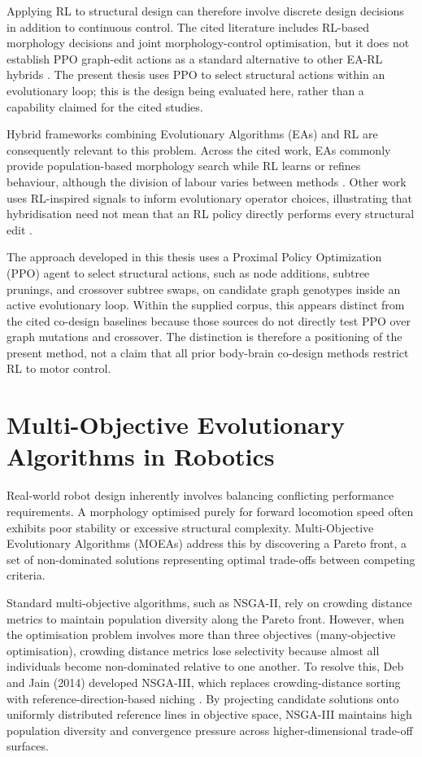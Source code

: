 \documentclass[12pt,a4paper]{report}
\begin{document}
Applying RL to structural design can therefore involve discrete design decisions in addition to continuous control. The cited literature includes RL-based morphology decisions and joint morphology-control optimisation, but it does not establish PPO graph-edit actions as a standard alternative to other EA-RL hybrids \citep{li2024reinforcement,sun2023co,li2024bridging}. The present thesis uses PPO to select structural actions within an evolutionary loop; this is the design being evaluated here, rather than a capability claimed for the cited studies.

Hybrid frameworks combining Evolutionary Algorithms (EAs) and RL are consequently relevant to this problem. Across the cited work, EAs commonly provide population-based morphology search while RL learns or refines behaviour, although the division of labour varies between methods \citep{li2023modular,sun2023co,li2024bridging}. Other work uses RL-inspired signals to inform evolutionary operator choices, illustrating that hybridisation need not mean that an RL policy directly performs every structural edit \citep{brown2025reinforcement}.

The approach developed in this thesis uses a Proximal Policy Optimization (PPO) agent to select structural actions, such as node additions, subtree prunings, and crossover subtree swaps, on candidate graph genotypes inside an active evolutionary loop. Within the supplied corpus, this appears distinct from the cited co-design baselines because those sources do not directly test PPO over graph mutations and crossover. The distinction is therefore a positioning of the present method, not a claim that all prior body-brain co-design methods restrict RL to motor control.

\section{Multi-Objective Evolutionary Algorithms in Robotics}
Real-world robot design inherently involves balancing conflicting performance requirements. A morphology optimised purely for forward locomotion speed often exhibits poor stability or excessive structural complexity. Multi-Objective Evolutionary Algorithms (MOEAs) address this by discovering a Pareto front, a set of non-dominated solutions representing optimal trade-offs between competing criteria.

Standard multi-objective algorithms, such as NSGA-II, rely on crowding distance metrics to maintain population diversity along the Pareto front. However, when the optimisation problem involves more than three objectives (many-objective optimisation), crowding distance metrics lose selectivity because almost all individuals become non-dominated relative to one another. To resolve this, Deb and Jain (2014) developed NSGA-III, which replaces crowding-distance sorting with reference-direction-based niching \citep{deb2014evolutionary}. By projecting candidate solutions onto uniformly distributed reference lines in objective space, NSGA-III maintains high population diversity and convergence pressure across higher-dimensional trade-off surfaces.
\end{document}

